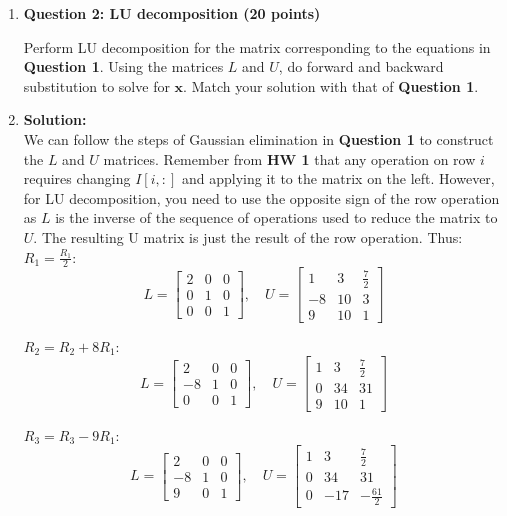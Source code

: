 \documentclass[11pt,letterpaper]{article}
\begin{document}
\begin{enumerate}
\begin{enumerate}
\item[] \textbf{Question 2: LU decomposition (20 points)} 

Perform LU decomposition for the matrix corresponding to the equations in \textbf{Question 1}. Using the matrices $L$ and $U$, do forward and backward substitution to solve for $\mathbf{x}$. Match your solution with that of \textbf{Question 1}.

\item[] \textbf{Solution:} \\
We can follow the steps of Gaussian elimination in \textbf{Question 1} to construct
the $L$ and $U$ matrices. Remember from \textbf{HW 1} that any operation on row 
$i$ requires changing $I[i, :]$ and applying it to the matrix on the left. However,
for LU decomposition, you need to use the opposite sign of the row operation as 
$L$ is the inverse of the sequence of operations used to reduce the matrix to $U$. 
The resulting U matrix is just the result of the row operation. Thus: \\
$R_1 = \frac{R_1}{2}$: 
\[L = \begin{bmatrix}
2 & 0 & 0 \\
0 & 1 & 0 \\
0 & 0 & 1
\end{bmatrix}, \quad U = \begin{bmatrix}
1 & 3 & \frac{7}{2} \\
-8 & 10 & 3 \\
9 & 10 & 1
\end{bmatrix}\]

$R_2 = R_2 + 8R_1$:
\[L = \begin{bmatrix}
2 & 0 & 0 \\
-8 & 1 & 0 \\
0 & 0 & 1 
\end{bmatrix}, \quad U = \begin{bmatrix}
1 & 3 & \frac{7}{2} \\
0 & 34 & 31 \\
9 & 10 & 1
\end{bmatrix}\]

$R_3 = R_3 - 9R_1$:
\[L = \begin{bmatrix}
2 & 0 & 0 \\
-8 & 1 & 0 \\
9 & 0 & 1 
\end{bmatrix}, \quad U = \begin{bmatrix}
1 & 3 & \frac{7}{2} \\
0 & 34 & 31 \\
0 & -17 & -\frac{61}{2}
\end{bmatrix}\]


\end{enumerate}
\end{enumerate}
\end{document}
